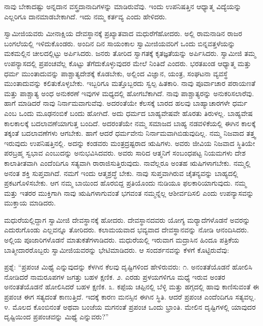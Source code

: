 ನಾವು ಬೇಕಾದಷ್ಟು ಅನ್ನದಾನ ವಸ್ತ್ರದಾನಾದಿಗಳನ್ನು ಮಾಡಿರುವೆವು. ಇಂದು ಉಪನಿಷತ್ತಿನ ಆಧ್ಯಾತ್ಮ ವಿದ್ಯೆಯನ್ನು ಎಲ್ಲರಿಗೂ ದಾನಮಾಡಬೇಕಾಗಿದೆ. ಇದು ನಮ್ಮ ಕರ್ತವ್ಯ ಎಂದು ಹೇಳಿದರು. 

 ಸ್ವಾಮೀಜಿಯವರು ಮೀನಾಕ್ಷಿಯ ದೇವಸ್ಥಾನಕ್ಕೆ ಪ್ರಖ್ಯಾತವಾದ ಮಧುರೆಗೆ\break ಹೋದರು. ಅಲ್ಲಿ ರಾಮನಾಡಿನ ರಾಜರ ಬಂಗಲೆಯಲ್ಲಿ ಇಳಿದುಕೊಂಡರು. ಅಂದಿನ ದಿನ ಸಾಯಂಕಾಲ ಸ್ವಾಮೀಜಿಯವರಿಗೆ ಒಂದು ಬಿನ್ನವತ್ತಳೆಯನ್ನು ಮಕಮಲ್ಲಿನ ಚೀಲದಲ್ಲಿಟ್ಟು ಅರ್ಪಿಸಿದರು. ಜನರು ತೋರಿದ ಸ್ವಾಗತಕ್ಕೆ ಕೃತಜ್ಞತೆಯನ್ನು ಅರ್ಪಿಸಿದರು. ಸ್ವಾಮೀಜಿ ತಮ್ಮ ಉಪನ್ಯಾಸದಲ್ಲಿ ಪ್ರಪಂಚವೆಲ್ಲ ಕೊಟ್ಟು ತೆಗೆದುಕೊಳ್ಳುವುದರ ಮೇಲೆ ನಿಂತಿದೆ ಎಂದರು. ಭರತಖಂಡ ಆಧ್ಯಾತ್ಮ ಮತ್ತು ಧರ್ಮ ಮುಂತಾದುವನ್ನು ಪಾಶ್ಚಾತ್ಯದೇಶಕ್ಕೆ ಕೊಡಬೇಕು, ಅಲ್ಲಿಂದ ವಿಜ್ಞಾನ, ಯಂತ್ರ, ಸಂಘಟನಾ ವ್ಯವಸ್ಥೆ ಮುಂತಾದುವನ್ನು ಕಲಿತುಕೊಳ್ಳಬೇಕು. ಇಬ್ಬರಿಗೂ ಮತ್ತೊಬ್ಬರದು ಸ್ವಲ್ಪ ಹಿತಕಾರಿ. ನಾವು ಪೂರ್ವಾಚಾರ ಪರಾಯಣತೆ ಮತ್ತು ಪಾಶ್ಚಾತ್ಯ ಅಂಧ ಅನುಕರಣೆ ಇವುಗಳ ಮಧ್ಯದಲ್ಲಿ ಹೋಗಬೆಕಾಗಿದೆ. ನಾವು ಪಾಶ್ಚಾತ್ಯರನ್ನು ಅನುಕರಿಸಲಾರೆವು. ಹಾಗೆ ಮಾಡಿದರೆ ನಾವು ನಿರ್ನಾಮವಾಗುವೆವು. ಅದರಂತೆಯೇ ಕೆಲಸಕ್ಕೆ ಬಾರದ ಹಲವು ಬಾಹ್ಯಾಚಾರಗಳೇ ಧರ್ಮ ಎಂಬ ಒಂದು ಮೂಢನಂಬಿಕೆ ಬಂದು ಹೋಗಿದೆ. ಅದು ಧರ್ಮದ ಬಾಹ್ಯವೇಷವೇ ಹೊರತು ತಿರುಳಲ್ಲ. ಬಾಹ್ಯವೇಷ ಕಾಲಕಾಲಕ್ಕೆ ಬದಲಾವಣೆಯಾಗುತ್ತ ಬಂದಿದೆ. ಅದರಂತೆಯೇ ನಮ್ಮ ಸಮಾಜದ ಬಾಹ್ಯ ನಡವಳಿಕೆಯಲ್ಲಿ ಈಗಿನ ಕಾಲಕ್ಕೆ ತಕ್ಕಂತೆ ಬದಲಾವಣೆಗಳು ಆಗಬೇಕು. ಹಾಗೆ ಆದರೆ ಧರ್ಮವೇನು ನಿರ್ನಾಮವಾಗಿಬಿಡುವುದಿಲ್ಲ. ನಮ್ಮ ನಿಜವಾದ ತತ್ತ್ವ ಇರುವುದು ಉಪನಿಷತ್ತಿನಲ್ಲಿ. ಅದನ್ನು ಕಂಡವರು ಮಂತ್ರದ್ರಷ್ಟರಾದ ಋಷಿಗಳು. ಅವರು ಜೀವಿಯ ನಿಜವಾದ ಸ್ಥಿತಿಯೇ ಪರಬ್ರಹ್ಮ ಸ್ವಭಾವ ಎಂಬುದನ್ನು ಅನುಭವಿಸಿದವರು. ಅವರು ಸಾರಿದ ಆತ್ಮನಿಗೆ ಸಂಬಂಧಪಟ್ಟ ನಿಯಮಗಳು ದೇಶ ಕಾಲಾತೀತವಾಗಿ ಎಂದೆಂದಿಗೂ ಸತ್ಯವಾಗಿ ರಾರಾಜಿಸುತ್ತಿರುವುದು. ನಾವೆಲ್ಲರೂ ಅಂತಹ ಋಷಿಗಳಾಗಬೇಕು. ನಮ್ಮಲ್ಲಿ ಅನಂತ ಶಕ್ತಿ ಸುಪ್ತವಾಗಿದೆ. ನಮಗೆ ಇಂದು ಆತ್ಮಶ್ರದ್ಧೆ ಬೇಕು. ನಾವು ಸುಪ್ತವಾಗಿರುವ ಚೈತನ್ಯವನ್ನು ಬಾಹ್ಯದಲ್ಲಿ ಪ್ರಕಟಗೊಳಿಸಬೇಕು. ಆಗ ನಮ್ಮ ಬಾಯಿಂದ ಹೊರಬಿದ್ದ ಪ್ರತಿಯೊಂದು ನುಡಿಯೂ ಫಲಕಾರಿಯಾಗುವುದು. ನಮ್ಮ ಮತ್ತು ಇತರರ ಮುಕ್ತಿಗಾಗಿ ನಾವು ಋಷಿಗಳಾಗುವಂತೆ ಭಗವಂತ ನಮ್ಮನ್ನೆಲ್ಲ ಆಶೀರ್ವದಿಸಲಿ ಎಂದು ಉಪನ್ಯಾಸವನ್ನು ಮುಕ್ತಾಯ ಮಾಡಿದರು. 

 ಮಧುರೆಯಲ್ಲಿದ್ದಾಗ ಸ್ವಾಮೀಜಿ ದೇವಸ್ಥಾನಕ್ಕೆ ಹೋದರು. ದೇವಸ್ಥಾನದವರು ಯೋಗ್ಯ ಮರ‍್ಯಾದೆಗಳೊಡನೆ ಅವರನ್ನು ಎದುರುಗೊಂಡು ಎಲ್ಲವನ್ನೂ ತೋರಿದರು. ಕಲಾಮಯವಾದ ಭವ್ಯವಾದ ದೇವಸ್ಥಾನವನ್ನು ನೋಡಿ ಆನಂದಿಸಿದರು. ಅಲ್ಲಿಯ ಪೂಜಾರಿಗಳೊಡನೆ ಮಾತುಕತೆಗಳಾಡಿದರು. ಮಧುರೆಯಲ್ಲಿ ಇರುವಾಗ ಮದ್ರಾಸಿನ ಹಿಂದೂ ಪತ್ರಿಕೆಯ ಬಾತ್ಮೀದಾರರೊಬ್ಬರು ಸ್ವಾಮೀಜಿಯವರನ್ನು ಭೇಟಿಮಾಡಿದರು. ಆ ಸಂದರ್ಶನವನ್ನು ಕೆಳಗೆ ಕೊಟ್ಟಿರುವೆವು: 

 ಪ್ರಶ್ನೆ: “ಪ್ರಪಂಚ ಮಿಥ್ಯೆ ಎನ್ನುವುದನ್ನು ಕೆಳಗಿನ ಕೆಲವು ದೃಷ್ಟಿಗಳಿಂದ ಹೇಳಿರುವರು: ೧. ಅನಂತತೆಯೊಡನೆ ಹೋಲಿಸಿ ನೋಡಿದರೆ ನಾಮರೂಪಗಳ ಜಗತ್ತು ಬಹಳ ಕ್ಷಣಿಕ. ೨. ಎರಡು ಪ್ರಳಯಗಳಿಗೂ ಮಧ್ಯೆ ಇರುವ ಅಂತರ ಅನಂತತೆಯೊಡನೆ ಹೋಲಿಸಿದರೆ ಬಹಳ ಕ್ಷಣಿಕ. ೩. ಕಪ್ಪೆಯ ಚಪ್ಪಿನಲ್ಲಿ ಬೆಳ್ಳಿ ಮತ್ತು ಹಗ್ಗದಲ್ಲಿ ಹಾವು ಕಾಣಿಸುವಂತೆ ಈ ಪ್ರಪಂಚ ಈಗ ಸತ್ಯದಂತೆ ಕಾಣುತ್ತಿದೆ. ಇದಕ್ಕೆ ಕಾರಣ ಮನಸ್ಸಿನ ಈಗಿನ ಸ್ಥಿತಿ. ಆದರೆ ಪ್ರಪಂಚ ಎಂದೆಂದಿಗೂ ಸತ್ಯವಲ್ಲ. ೪. ಮೊಲದ ಕೊಂಬಿನಂತೆ ಅಥವಾ ಬಂಜೆಯ ಮಗನಂತೆ ಪ್ರಪಂಚ ಒಂದು ಭ್ರಾಂತಿ. ಮೇಲಿನ ದೃಷ್ಟಿಗಳಲ್ಲಿ ಯಾವುದರ ದೃಷ್ಟಿಯಿಂದ ಪ್ರಪಂಚವನ್ನು ಮಿಥ್ಯೆ ಎನ್ನುವರು?” 

